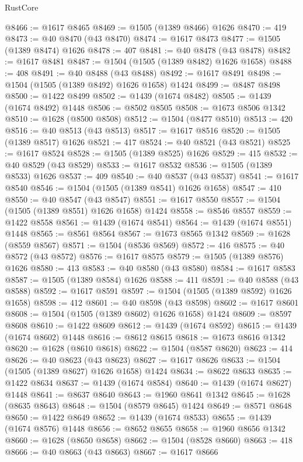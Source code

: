 \begin{lexlean}{RustCore}
\begin{coremodule}
@8466 := @1617 @8465
@8469 := @1505 (@1389 @8466) @1626
@8470 := 419
@8473 := @40 @8470 (@43 @8470)
@8474 := @1617 @8473
@8477 := @1505 (@1389 @8474) @1626
@8478 := 407
@8481 := @40 @8478 (@43 @8478)
@8482 := @1617 @8481
@8487 := @1504 (@1505 (@1389 @8482) @1626 @1658)
@8488 := 408
@8491 := @40 @8488 (@43 @8488)
@8492 := @1617 @8491
@8498 := @1504 (@1505 (@1389 @8492) @1626 @1658) @1424
@8499 := @8487 @8498
@8500 := @1422 @8499
@8502 := @1439 (@1674 @8482)
@8505 := @1439 (@1674 @8492) @1448
@8506 := @8502 @8505
@8508 := @1673 @8506 @1342
@8510 := @1628 (@8500 @8508)
@8512 := @1504 (@8477 @8510)
@8513 := 420
@8516 := @40 @8513 (@43 @8513)
@8517 := @1617 @8516
@8520 := @1505 (@1389 @8517) @1626
@8521 := 417
@8524 := @40 @8521 (@43 @8521)
@8525 := @1617 @8524
@8528 := @1505 (@1389 @8525) @1626
@8529 := 415
@8532 := @40 @8529 (@43 @8529)
@8533 := @1617 @8532
@8536 := @1505 (@1389 @8533) @1626
@8537 := 409
@8540 := @40 @8537 (@43 @8537)
@8541 := @1617 @8540
@8546 := @1504 (@1505 (@1389 @8541) @1626 @1658)
@8547 := 410
@8550 := @40 @8547 (@43 @8547)
@8551 := @1617 @8550
@8557 := @1504 (@1505 (@1389 @8551) @1626 @1658) @1424
@8558 := @8546 @8557
@8559 := @1422 @8558
@8561 := @1439 (@1674 @8541)
@8564 := @1439 (@1674 @8551) @1448
@8565 := @8561 @8564
@8567 := @1673 @8565 @1342
@8569 := @1628 (@8559 @8567)
@8571 := @1504 (@8536 @8569)
@8572 := 416
@8575 := @40 @8572 (@43 @8572)
@8576 := @1617 @8575
@8579 := @1505 (@1389 @8576) @1626
@8580 := 413
@8583 := @40 @8580 (@43 @8580)
@8584 := @1617 @8583
@8587 := @1505 (@1389 @8584) @1626
@8588 := 411
@8591 := @40 @8588 (@43 @8588)
@8592 := @1617 @8591
@8597 := @1504 (@1505 (@1389 @8592) @1626 @1658)
@8598 := 412
@8601 := @40 @8598 (@43 @8598)
@8602 := @1617 @8601
@8608 := @1504 (@1505 (@1389 @8602) @1626 @1658) @1424
@8609 := @8597 @8608
@8610 := @1422 @8609
@8612 := @1439 (@1674 @8592)
@8615 := @1439 (@1674 @8602) @1448
@8616 := @8612 @8615
@8618 := @1673 @8616 @1342
@8620 := @1628 (@8610 @8618)
@8622 := @1504 (@8587 @8620)
@8623 := 414
@8626 := @40 @8623 (@43 @8623)
@8627 := @1617 @8626
@8633 := @1504 (@1505 (@1389 @8627) @1626 @1658) @1424
@8634 := @8622 @8633
@8635 := @1422 @8634
@8637 := @1439 (@1674 @8584)
@8640 := @1439 (@1674 @8627) @1448
@8641 := @8637 @8640
@8643 := @1960 @8641 @1342
@8645 := @1628 (@8635 @8643)
@8648 := @1504 (@8579 @8645) @1424
@8649 := @8571 @8648
@8650 := @1422 @8649
@8652 := @1439 (@1674 @8533)
@8655 := @1439 (@1674 @8576) @1448
@8656 := @8652 @8655
@8658 := @1960 @8656 @1342
@8660 := @1628 (@8650 @8658)
@8662 := @1504 (@8528 @8660)
@8663 := 418
@8666 := @40 @8663 (@43 @8663)
@8667 := @1617 @8666

\end{coremodule}
\end{lexlean}
